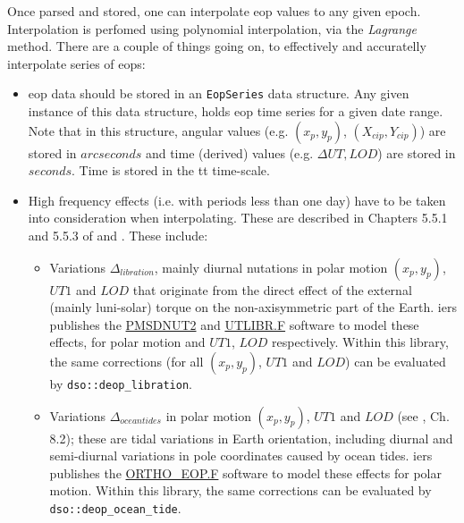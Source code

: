 Once parsed and stored, one can interpolate \gls{eop} values to any given epoch. 
Interpolation is perfomed using polynomial interpolation, via the \emph{Lagrange} method. 
There are a couple of things going on, to effectively and accuratelly interpolate 
series of \glspl{eop}:
\begin{itemize}
  \item \gls{eop} data should be stored in an \texttt{EopSeries} 
    data structure. Any given instance of this data structure, holds \gls{eop} 
    time series for a given date range. Note that in this structure, angular values 
    (e.g. $(x_p, y_p)$, $(X_{cip}, Y_{cip})$) are stored in $arcseconds$ and 
    time (derived) values (e.g. $\Delta UT, LOD$) are stored in $seconds$. Time is 
    stored in the \gls{tt} time-scale.

  \item High frequency effects (i.e. with periods less than one day) have to be 
    taken into consideration when interpolating. These are described in Chapters 
    5.5.1 and 5.5.3 of \cite{iers2010} and \cite{Bradley2016}. These include:
    
    \begin{itemize}
      \item Variations $\Delta _{libration}$, mainly diurnal nutations in 
        polar motion $(x_p, y_p)$, $UT1$ and $LOD$ that originate from the direct 
        effect of the external (mainly luni-solar) torque on the non-axisymmetric 
        part of the Earth. \gls{iers} publishes the 
        \href{https://iers-conventions.obspm.fr/content/chapter5/software/PMSDNUT2.F}{PMSDNUT2} 
        and \href{https://iers-conventions.obspm.fr/content/chapter5/software/UTLIBR.F}{UTLIBR.F} 
        software to model these effects, for polar motion and $UT1$, $LOD$ respectively. 
        Within this library, the same corrections (for all $(x_p, y_p)$, $UT1$ and $LOD$) 
        can be evaluated by \texttt{dso::deop\_libration}.

      \item Variations $\Delta _{ocean tides}$ in polar motion $(x_p, y_p)$, $UT1$ and $LOD$ (see \cite{iers2010}, Ch. 8.2); 
        these are tidal variations in Earth orientation, including diurnal and semi-diurnal 
        variations in pole coordinates caused by ocean tides. \gls{iers} publishes the 
        \href{https://iers-conventions.obspm.fr/content/chapter8/software/ORTHO_EOP.F}{ORTHO\_EOP.F} 
        software to model these effects for polar motion. Within this library, the same 
        corrections can be evaluated by \texttt{dso::deop\_ocean\_tide}.
        

\end{itemize}
\end{itemize}
